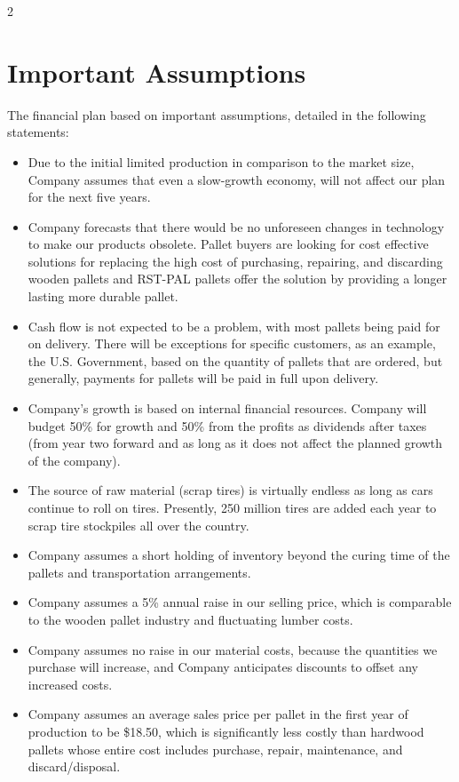 \documentclass[9pt,]{book}
\providecommand{\tightlist}{%
  \setlength{\itemsep}{0pt}\setlength{\parskip}{0pt}}
\begin{document}
\begin {multicols}{2}

\lipsum

\end {multicols}

\hypertarget{important-assumptions}{%
\section{Important Assumptions}\label{important-assumptions}}

The financial plan based on important assumptions, detailed in the
following statements:

\begin{itemize}
\tightlist
\item
  Due to the initial limited production in comparison to the market
  size, Company assumes that even a slow-growth economy, will not affect
  our plan for the next five years.
\item
  Company forecasts that there would be no unforeseen changes in
  technology to make our products obsolete. Pallet buyers are looking
  for cost effective solutions for replacing the high cost of
  purchasing, repairing, and discarding wooden pallets and RST-PAL
  pallets offer the solution by providing a longer lasting more durable
  pallet.
\item
  Cash flow is not expected to be a problem, with most pallets being
  paid for on delivery. There will be exceptions for specific customers,
  as an example, the U.S. Government, based on the quantity of pallets
  that are ordered, but generally, payments for pallets will be paid in
  full upon delivery.
\item
  Company's growth is based on internal financial resources. Company
  will budget 50\% for growth and 50\% from the profits as dividends
  after taxes (from year two forward and as long as it does not affect
  the planned growth of the company).
\item
  The source of raw material (scrap tires) is virtually endless as long
  as cars continue to roll on tires. Presently, 250 million tires are
  added each year to scrap tire stockpiles all over the country.
\item
  Company assumes a short holding of inventory beyond the curing time of
  the pallets and transportation arrangements.
\item
  Company assumes a 5\% annual raise in our selling price, which is
  comparable to the wooden pallet industry and fluctuating lumber costs.
\item
  Company assumes no raise in our material costs, because the quantities
  we purchase will increase, and Company anticipates discounts to offset
  any increased costs.
\item
  Company assumes an average sales price per pallet in the first year of
  production to be \$18.50, which is significantly less costly than
  hardwood pallets whose entire cost includes purchase, repair,
  maintenance, and discard/disposal.
\end{itemize}
\end{document}
